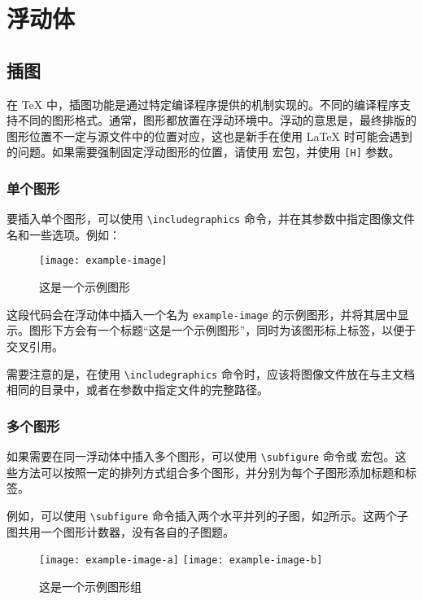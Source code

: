 \section{浮动体}\label{sec:float}

\subsection{插图}

在 \TeX{} 中，插图功能是通过特定编译程序提供的机制实现的。不同的编译程序支持不同的图形格式。通常，图形都放置在浮动环境中。浮动的意思是，最终排版的图形位置不一定与源文件中的位置对应，这也是新手在使用 \LaTeX{} 时可能会遇到的问题。如果需要强制固定浮动图形的位置，请使用  宏包，并使用 \texttt{[H]} 参数。

\subsubsection{单个图形}

要插入单个图形，可以使用 \verb|\includegraphics| 命令，并在其参数中指定图像文件名和一些选项。例如：

\begin{figure}[htbp]
    \centering
    \texttt{[image: example-image]}
    \caption{这是一个示例图形}
    \label{fig:example}
\end{figure}

这段代码会在浮动体中插入一个名为 \verb|example-image| 的示例图形，并将其居中显示。图形下方会有一个标题“这是一个示例图形”，同时为该图形标上标签，以便于交叉引用。

需要注意的是，在使用 \verb|\includegraphics| 命令时，应该将图像文件放在与主文档相同的目录中，或者在参数中指定文件的完整路径。

\subsubsection{多个图形}

如果需要在同一浮动体中插入多个图形，可以使用 \verb|\subfigure| 命令或  宏包。这些方法可以按照一定的排列方式组合多个图形，并分别为每个子图形添加标题和标签。

例如，可以使用 \verb|\subfigure| 命令插入两个水平并列的子图，如\cref{fig:example-subfig-1}所示。这两个子图共用一个图形计数器，没有各自的子图题。

\begin{figure}[!htp]
\centering
\texttt{[image: example-image-a]}
\hspace{1cm}
\texttt{[image: example-image-b]}
\caption{这是一个示例图形组}
\label{fig:example-subfig-1}
\end{figure}


